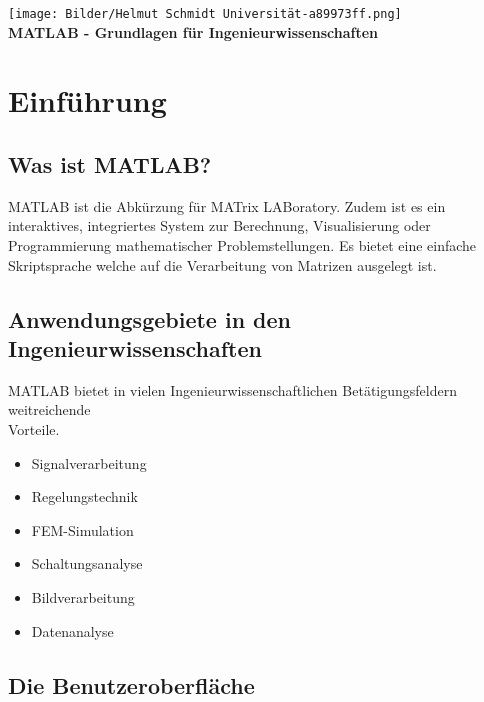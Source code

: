 \documentclass[12pt, a4paper, twoside]{article}
\begin{document}
    \thispagestyle{empty}
     \vspace*{4cm}
    \begin{center}
        \texttt{[image: Bilder/Helmut Schmidt Universität-a89973ff.png]}\\
        \vspace{2cm}
        \huge\textbf{MATLAB - Grundlagen für Ingenieurwissenschaften}
    \end{center}
    \newpage

    \renewcommand{\contentsname}{Inhaltsverzeichnis}
    \tableofcontents
    \newpage
    \section{Einführung}
        \subsection{Was ist MATLAB?}
        MATLAB ist die Abkürzung für MATrix LABoratory. Zudem ist es ein interaktives, integriertes System zur Berechnung, Visualisierung oder Programmierung mathematischer Problemstellungen. Es bietet eine einfache Skriptsprache welche auf die Verarbeitung von Matrizen ausgelegt ist.
        \subsection{Anwendungsgebiete in den Ingenieurwissenschaften}
        MATLAB bietet in vielen Ingenieurwissenschaftlichen Betätigungsfeldern weitreichende \\Vorteile.
        \begin{itemize}
            \item Signalverarbeitung
            \item Regelungstechnik
            \item FEM-Simulation
            \item Schaltungsanalyse
            \item Bildverarbeitung
            \item Datenanalyse
        \end{itemize}
        \subsection{Die Benutzeroberfläche}
\end{document}
